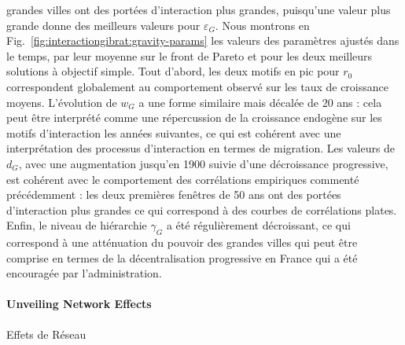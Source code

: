 {grandes villes ont des portées d'interaction plus grandes, puisqu'une valeur plus grande donne des meilleurs valeurs pour $\varepsilon_G$. Nous montrons en Fig.~\ref{fig:interactiongibrat:gravity-params} les valeurs des paramètres ajustés dans le temps, par leur moyenne sur le front de Pareto et pour les deux meilleurs solutions à objectif simple. Tout d'abord, les deux motifs en pic pour $r_0$ correspondent globalement au comportement observé sur les taux de croissance moyens. L'évolution de $w_G$ a une forme similaire mais décalée de 20 ans : cela peut être interprété comme une répercussion de la croissance endogène sur les motifs d'interaction les années suivantes, ce qui est cohérent avec une interprétation des processus d'interaction en termes de migration. Les valeurs de $d_G$, avec une augmentation jusqu'en 1900 suivie d'une décroissance progressive, est cohérent avec le comportement des corrélations empiriques commenté précédemment : les deux premières fenêtres de 50 ans ont des portées d'interaction plus grandes ce qui correspond à des courbes de corrélations plates. Enfin, le niveau de hiérarchie $\gamma_G$ a été régulièrement décroissant, ce qui correspond à une atténuation du pouvoir des grandes villes qui peut être comprise en termes de la décentralisation progressive en France qui a été encouragée par l'administration.
}



\paragraph{Unveiling Network Effects}{Effets de Réseau}


